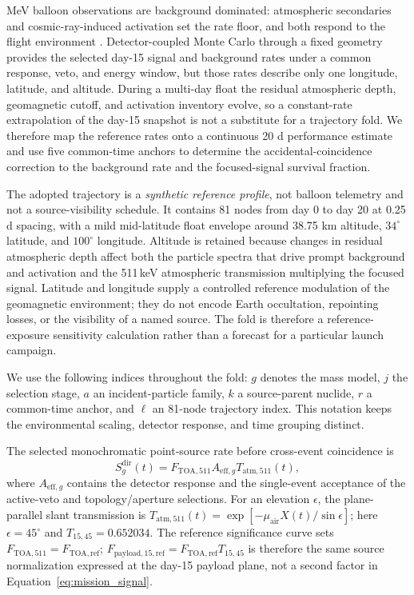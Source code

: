 \documentclass[11pt]{article}
\newcommand{\ftoaref}{F_{\mathrm{TOA,ref}}}
\newcommand{\fpayloadref}{F_{\mathrm{payload,15,ref}}}
\begin{document}
MeV balloon observations are background dominated: atmospheric secondaries and
cosmic-ray-induced activation set the rate floor, and both respond to the flight
environment \cite{Gallego2025Balloon,Kierans2017}. Detector-coupled Monte Carlo
through a fixed geometry provides the selected day-15 signal and background
rates under a common response, veto, and energy window, but those rates describe
only one longitude, latitude, and altitude. During a multi-day float the residual
atmospheric depth, geomagnetic cutoff, and activation inventory evolve, so a
constant-rate extrapolation of the day-15 snapshot is not a substitute for a
trajectory fold. We therefore map the reference rates onto a continuous 20 d
performance estimate and use five common-time anchors to determine the
accidental-coincidence correction to the background rate and the focused-signal
survival fraction.

The adopted trajectory is a \emph{synthetic reference profile}, not balloon
telemetry and not a source-visibility schedule. It contains 81 nodes from day 0
to day 20 at 0.25 d spacing, with a mild mid-latitude float envelope around
38.75 km altitude, $34^\circ$ latitude, and $100^\circ$ longitude. Altitude is
retained because changes in residual atmospheric depth affect both the particle
spectra that drive prompt background and activation and the 511\,keV atmospheric
transmission multiplying the focused signal. Latitude and longitude supply a
controlled reference modulation of the geomagnetic environment; they do not
encode Earth occultation, repointing losses, or the visibility of a named source.
The fold is therefore a reference-exposure sensitivity calculation rather than a
forecast for a particular launch campaign.

We use the following indices throughout the fold: $g$ denotes the mass model,
$j$ the selection stage, $a$ an incident-particle family, $k$ a source-parent
nuclide, $r$ a common-time anchor, and $\ell$ an 81-node trajectory index. This
notation keeps the environmental scaling, detector response, and time grouping
distinct.

The selected monochromatic point-source rate before cross-event coincidence is
\begin{equation}
 S^{\mathrm{dir}}_g(t)=F_{\mathrm{TOA},511}A_{\mathrm{eff},g}T_{\mathrm{atm},511}(t),
 \label{eq:mission_signal}
\end{equation}
where $A_{\mathrm{eff},g}$ contains the detector response and the single-event
acceptance of the active-veto and topology/aperture selections. For an elevation $\epsilon$, the plane-parallel
slant transmission is
$T_{\mathrm{atm},511}(t)=\exp[-\mu_{\mathrm{air}}X(t)/\sin\epsilon]$; here
$\epsilon=45^\circ$ and $T_{15,45}=0.652034$. The reference significance curve
sets $F_{\mathrm{TOA},511}=\ftoaref$; $\fpayloadref=\ftoaref T_{15,45}$ is therefore the
same source normalization expressed at the day-15 payload plane, not a second
factor in Equation~\eqref{eq:mission_signal}.
\end{document}
